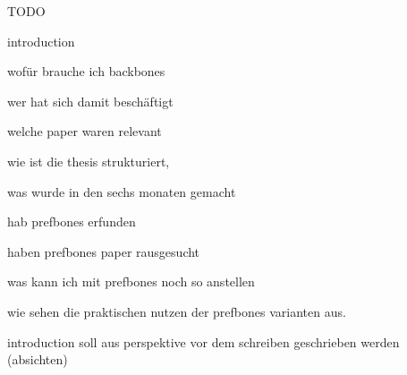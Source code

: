 TODO

introduction

wofür brauche ich backbones

wer hat sich damit beschäftigt

welche paper waren relevant

wie ist die thesis strukturiert, 

was wurde in den sechs monaten gemacht





hab prefbones erfunden

haben prefbones paper rausgesucht

was kann ich mit prefbones noch so anstellen

wie sehen die praktischen nutzen der prefbones varianten aus.



introduction soll aus perspektive vor dem schreiben geschrieben werden (absichten)